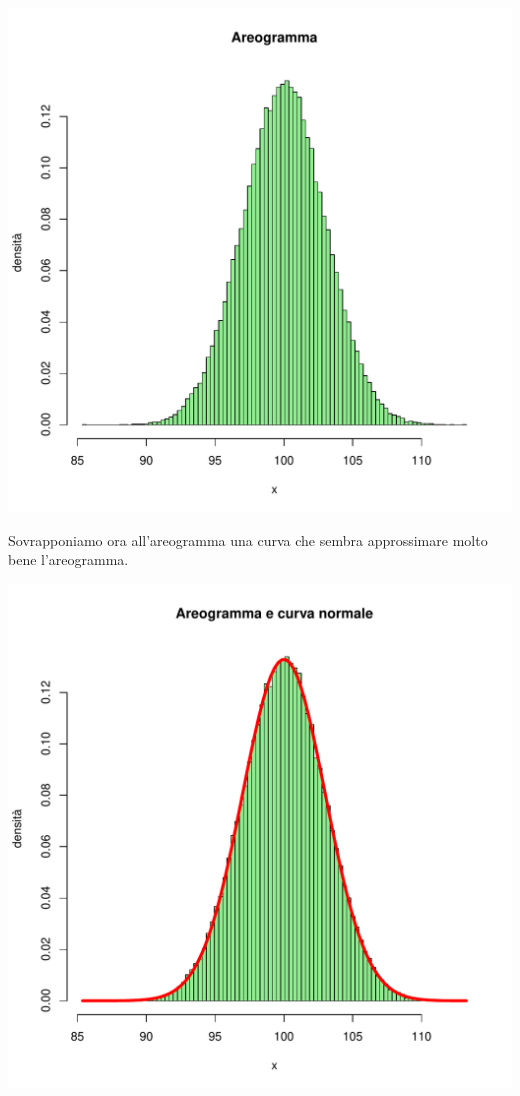 \documentclass[onecolumn,12pt]{book}\usepackage[]{graphicx}\usepackage[]{color}
\makeatletter
\def\maxwidth{ %
  \ifdim\Gin@nat@width>\linewidth
    \linewidth
  \else
    \Gin@nat@width
  \fi
}
\newenvironment{knitrout}{}{} %
\makeatother
\begin{document}
\begin{knitrout}
\color{fgcolor}
\includegraphics[width=\maxwidth]{figure/unnamed-chunk-133-1} 

\end{knitrout}

Sovrapponiamo ora all'areogramma una curva che sembra approssimare molto bene l'areogramma. 


\begin{knitrout}
\color{fgcolor}
\includegraphics[width=\maxwidth]{figure/unnamed-chunk-134-1} 

\end{knitrout}
\end{document}
